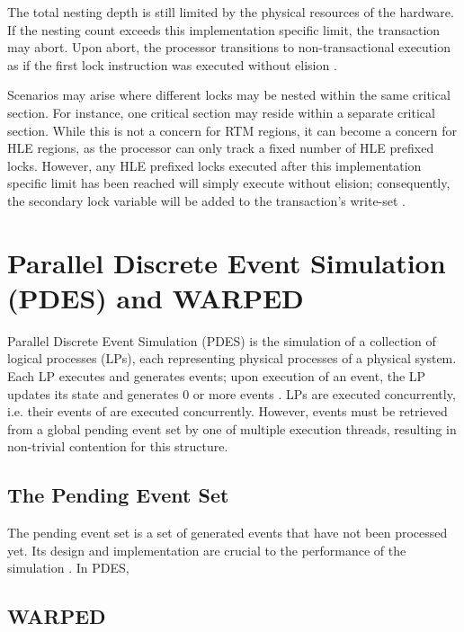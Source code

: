 \documentclass[a4paper]{article}
\begin{document}
\indent
The total nesting depth is still limited by the physical resources of
the hardware.  If the nesting count exceeds this implementation specific limit,
the transaction may abort.  Upon abort, the processor transitions to
non-transactional execution as if the first lock instruction was executed
without elision \cite{intel_prog_ref}.
\par

\indent
Scenarios may arise where different locks may be nested within the same
critical section.  For instance, one critical section may reside within a
separate critical section.  While this is not a concern for RTM regions, it can
become a concern for HLE regions, as the processor can only track a fixed number
of HLE prefixed locks.  However, any HLE prefixed locks executed after this
implementation specific limit has been reached will simply execute without
elision; consequently, the secondary lock variable will be added to the
transaction's write-set \cite{intel_prog_ref}.
\par

\newpage
\section{\textbf{Parallel Discrete Event Simulation (PDES) and WARPED}}

\indent
Parallel Discrete Event Simulation (PDES) is the simulation of a collection of
logical processes (LPs), each representing physical processes of a physical
system.  Each LP executes and generates events; upon execution of an event, the
LP updates its state and generates 0 or more events \cite{muthalagu}.  LPs are
executed concurrently, i.e. their events of are executed concurrently.  However,
events must be retrieved from a global pending event set by one of multiple
execution threads, resulting in non-trivial contention for this structure.
\par

\subsection{\textbf{The Pending Event Set}}

\indent The pending event set is a set of generated events that have not been
processed yet.  Its design and implementation are crucial to the performance of
the simulation \cite{twpes}.  In PDES,  

\subsection{\textbf{WARPED}}
\end{document}
